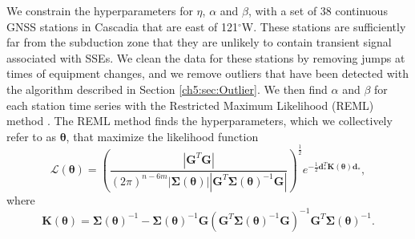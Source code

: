 We constrain the hyperparameters for $\eta$, $\alpha$ and $\beta$, with a set of 38 continuous GNSS stations in Cascadia that are east of 121$^\circ$W.  These stations are sufficiently far from the subduction zone that they are unlikely to contain transient signal associated with SSEs.  We clean the data for these stations by removing jumps at times of equipment changes, and we remove outliers that have been detected with the algorithm described in Section \ref{ch5:sec:Outlier}. We then find $\alpha$ and $\beta$ for each station time series with the Restricted Maximum Likelihood (REML) method \cite[e.g.,][]{Harville1974,Cressie1992,Hines2017}. The REML method finds the hyperparameters, which we collectively refer to as $\mathbf{\theta}$, that maximize the likelihood function
\begin{equation}\label{ch5:eq:REML}
\mathcal{L}(\mathbf{\theta}) = \left(\frac{\left|\mathbf{G}^T\mathbf{G}\right|}
                           {(2\pi)^{n-6m} 
                           \left| \mathbf{\Sigma}(\mathbf{\theta}) \right| 
                           \left| \mathbf{G}^T\mathbf{\Sigma}(\mathbf{\theta})^{-1}\mathbf{G} \right|}\right)^{\frac{1}{2}} 
                           e^{-\tfrac{1}{2}\mathbf{d}_*^T\mathbf{K}(\mathbf{\theta})\mathbf{d}_*},
\end{equation}
where
\begin{equation}
\mathbf{K}(\mathbf{\theta}) = \mathbf{\Sigma}(\mathbf{\theta})^{-1} - 
                      \mathbf{\Sigma}(\mathbf{\theta})^{-1}\mathbf{G}
         \left(\mathbf{G}^T\mathbf{\Sigma}(\mathbf{\theta})^{-1}\mathbf{G}\right)^{-1}
         \mathbf{G}^T\mathbf{\Sigma}(\mathbf{\theta})^{-1}.
\end{equation}
